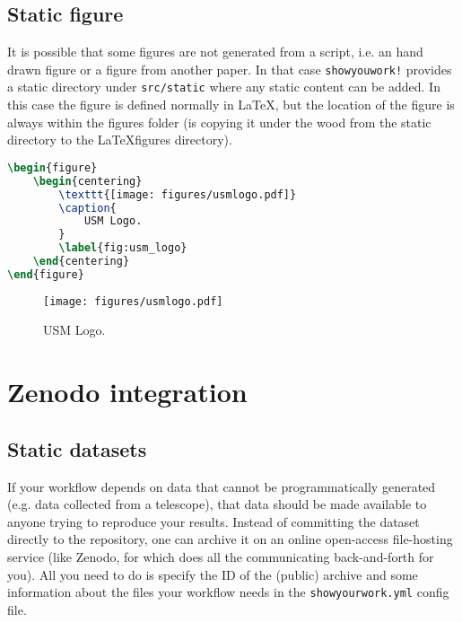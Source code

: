 \documentclass{aa}
\begin{document}
\subsection{Static figure}
It is possible that some figures are not generated from a script, i.e. an hand drawn figure or a figure from another paper. In that case \texttt{showyouwork!} provides a static directory under \texttt{src/static} where any static content can be added. In this case the figure is defined normally in \LaTeX, but the location of the figure is always within the figures folder (\showyourwork is copying it under the wood from the static directory to the \LaTeX figures directory).
\begin{lstlisting}[language=TeX]
\begin{figure}
    \begin{centering}
        \texttt{[image: figures/usmlogo.pdf]}
        \caption{
            USM Logo.
        }
        \label{fig:usm_logo}
    \end{centering}
\end{figure}
\end{lstlisting}

\begin{figure}
    \begin{centering}
        \texttt{[image: figures/usmlogo.pdf]}
        \caption{
            USM Logo.
        }
        \label{fig:usm_logo}
    \end{centering}
\end{figure}

\section{Zenodo integration}

\subsection{Static datasets}
If your workflow depends on data that cannot be programmatically generated (e.g. data collected from a telescope), that data should be made available to anyone trying to reproduce your results. Instead of committing the dataset directly to the repository, one can archive it on an online open-access file-hosting service (like Zenodo, for which \showyourwork does all the communicating back-and-forth for you). All you need to do is specify the ID of the (public) archive and some information about the files your workflow needs in the \texttt{showyourwork.yml} config file.
\end{document}
